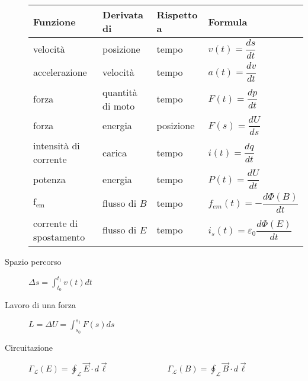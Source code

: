 \documentclass[a4paper,11pt,italian]{article}
\begin{document}
\begin{description}
  \begin{table}[hbtp]\centering
  \begin{tabular}{llll}\toprule
    \textbf{Funzione} & \textbf{Derivata di} & \textbf{Rispetto a} & \textbf{Formula} \\\midrule
    velocità          & posizione            & tempo               & $ v(t) = \dfrac{ds}{dt} $ \\\addlinespace[.8em]
    accelerazione     & velocità             & tempo               & $ a(t) = \dfrac{dv}{dt} $ \\\addlinespace[.8em]
    forza             & quantità di moto     & tempo               & $ F(t) = \dfrac{dp}{dt} $ \\\addlinespace[.8em]
    forza             & energia              & posizione           & $ F(s) = \dfrac{dU}{ds} $ \\\addlinespace[.8em]
    intensità di corrente & carica           & tempo               & $ i(t) = \dfrac{dq}{dt} $ \\\addlinespace[.8em]
    potenza           & energia              & tempo               & $ P(t) = \dfrac{dU}{dt} $ \\\addlinespace[.8em]
    $ \textrm{f}_{\textrm{em}} $ & flusso di $ B $ & tempo         & $ f_{em}(t) = -\dfrac{d\Phi(B)}{dt} $ \\\addlinespace[.8em]
    corrente di spostamento & flusso di $ E $ & tempo         & $ i_s(t) = \varepsilon_0 \dfrac{d\Phi(E)}{dt} $ \\\bottomrule
  \end{tabular}
  \end{table}
  
  \item[Spazio percorso]
  $ \Delta s = \displaystyle\int_{t_0}^{t_1} v(t) dt $
  
  \item[Lavoro di una forza]
  $ L = \Delta U = \displaystyle\int_{s_0}^{s_1} F(s) ds $
  
  \item[Circuitazione] $ \displaystyle \Gamma_\mathscr{L}(E) = \oint_\mathscr{L} \vec{E} \cdot d\vec{\ell} $~~~~~~~~~~~~~~$ \displaystyle \Gamma_\mathscr{L}(B) = \oint_\mathscr{L} \vec{B} \cdot d\vec{\ell} $
\end{description}
\end{document}
